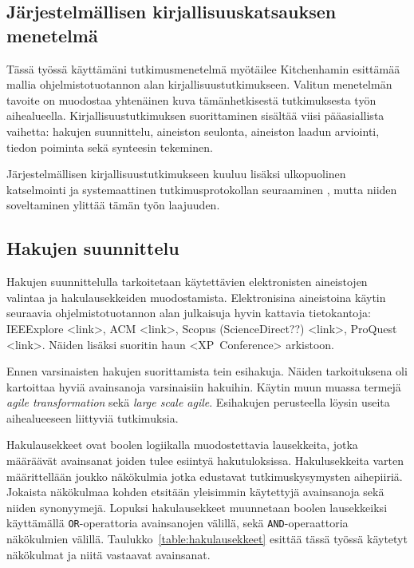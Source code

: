 \subsection{Järjestelmällisen kirjallisuuskatsauksen menetelmä}

Tässä työssä käyttämäni tutkimusmenetelmä myötäilee Kitchenhamin esittämää
mallia ohjelmistotuotannon alan kirjallisuustutkimukseen. Valitun menetelmän
tavoite on muodostaa yhtenäinen kuva tämänhetkisestä tutkimuksesta työn
aihealueella. Kirjallisuustutkimuksen suorittaminen sisältää viisi pääasiallista
vaihetta: hakujen suunnittelu, aineiston seulonta, aineiston laadun arviointi,
tiedon poiminta sekä synteesin tekeminen. \citep{Kitchenham2007}

Järjestelmällisen kirjallisuustutkimukseen kuuluu lisäksi ulkopuolinen
katselmointi ja systemaattinen tutkimusprotokollan seuraaminen
\citep{Kitchenham2007}, mutta niiden soveltaminen ylittää tämän työn laajuuden.

\subsection{Hakujen suunnittelu}
Hakujen suunnittelulla tarkoitetaan käytettävien elektronisten aineistojen
valintaa ja hakulausekkeiden muodostamista. Elektronisina aineistoina käytin
seuraavia ohjelmistotuotannon alan julkaisuja hyvin kattavia tietokantoja:
IEEExplore <link>, ACM <link>, Scopus (ScienceDirect??) <link>, ProQuest <link>.
Näiden lisäksi suoritin haun <XP~Conference> arkistoon.

Ennen varsinaisten hakujen suorittamista tein esihakuja. Näiden tarkoituksena
oli kartoittaa hyviä avainsanoja varsinaisiin hakuihin. Käytin muun muassa
termejä \textit{agile transformation} sekä \textit{large scale agile}.
Esihakujen perusteella löysin useita aihealueeseen liittyviä tutkimuksia.

Hakulausekkeet ovat boolen logiikalla muodostettavia lausekkeita, jotka
määräävät avainsanat joiden tulee esiintyä hakutuloksissa. Hakulusekkeita varten
määrittellään joukko näkökulmia jotka edustavat tutkimuskysymysten aihepiiriä.
Jokaista näkökulmaa kohden etsitään yleisimmin käytettyjä avainsanoja sekä
niiden synonyymejä. Lopuksi hakulausekkeet muunnetaan boolen lausekkeiksi
käyttämällä \texttt{OR}-operattoria avainsanojen välillä, sekä
\texttt{AND}-operaattoria näkökulmien välillä.
Taulukko~\ref{table:hakulausekkeet} esittää tässä työssä käytetyt näkökulmat ja
niitä vastaavat avainsanat.

